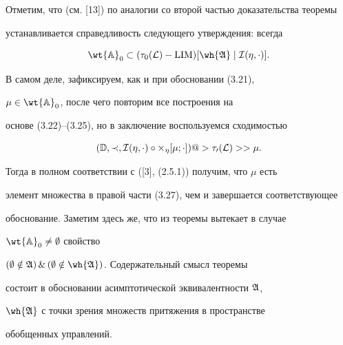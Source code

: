 Отметим, что (см. [13]) по аналогии со второй частью доказательства теоремы


устанавливается справедливость следующего утверждения: всегда


\begin{equation}


\wt{\Bbb A}_0\subset(\tau_0(\cal L)-


\LIM)[\wh{\frak A}\mid\cal I(\eta,\cdot)].


\end{equation}


В самом деле, зафиксируем, как и при обосновании (3.21),


$\mu\in\wt{\Bbb A}_0$, после чего повторим все построения на


основе (3.22)--(3.25), но в заключение воспользуемся сходимостью


$$


(\Bbb D,\prec,\cal I(\eta,\cdot)\circ\Theta_\eta[\mu;


\cdot])@>\tau_0(\cal L)>>\mu.


$$


Тогда в полном соответствии с ([3], (2.5.1)) получим, что $\mu$ есть


элемент множества в правой части (3.27), чем и завершается соответствующее


обоснование. Заметим здесь же, что из теоремы вытекает в случае


$\wt{\Bbb A}_0\ne\emptyset$ свойство


$(\emptyset\notin\frak A)\,\&\,


(\emptyset\notin\wh{\frak A})$. Содержательный смысл теоремы


состоит в обосновании асимптотической эквивалентности $\frak A$,


$\wh {\frak A}$ с точки зрения множеств притяжения в пространстве


обобщенных управлений.





